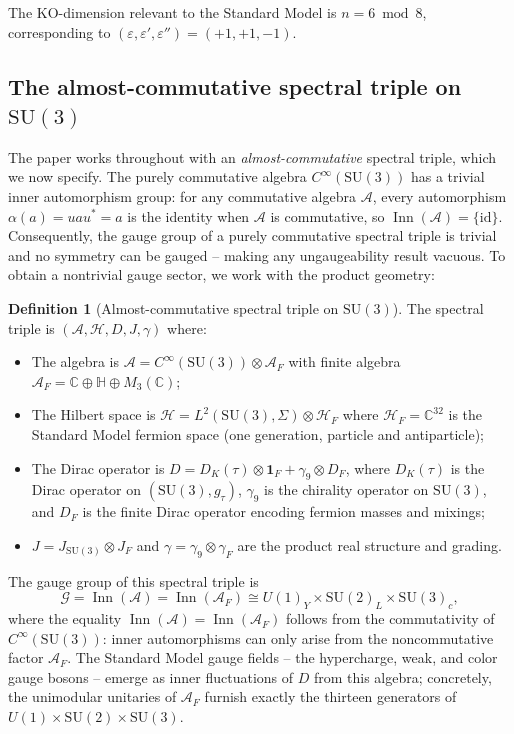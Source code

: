 \documentclass[12pt]{article}
\theoremstyle{definition}
\newtheorem{definition}[theorem]{Definition}
\theoremstyle{remark}
\newcommand{\Hil}{\mathcal{H}}
\newcommand{\Alg}{\mathcal{A}}
\newcommand{\Inn}{\operatorname{Inn}}
\begin{document}
The KO-dimension relevant to the Standard Model is $n = 6 \bmod 8$, corresponding to $(\varepsilon, \varepsilon', \varepsilon'') = (+1, +1, -1)$.

\subsection{The almost-commutative spectral triple on \texorpdfstring{$\mathrm{SU}(3)$}{SU(3)}}
\label{subsec:almostcommutative}

The paper works throughout with an \emph{almost-commutative} spectral triple, which we now specify.  The purely commutative algebra $C^\infty(\mathrm{SU}(3))$ has a trivial inner automorphism group: for any commutative algebra $\Alg$, every automorphism $\alpha(a) = u a u^* = a$ is the identity when $\Alg$ is commutative, so $\Inn(\Alg) = \{\mathrm{id}\}$.  Consequently, the gauge group of a purely commutative spectral triple is trivial and no symmetry can be gauged -- making any ungaugeability result vacuous.  To obtain a nontrivial gauge sector, we work with the product geometry:

\begin{definition}[Almost-commutative spectral triple on $\mathrm{SU}(3)$]\label{def:almostcomm}
\sloppy The spectral triple is $(\Alg, \Hil, D, J, \gamma)$ where:
\begin{itemize}
  \item The algebra is $\Alg = C^\infty(\mathrm{SU}(3)) \otimes \Alg_F$ with finite algebra $\Alg_F = \mathbb{C} \oplus \mathbb{H} \oplus M_3(\mathbb{C})$;
  \item The Hilbert space is $\Hil = L^2(\mathrm{SU}(3), \Sigma) \otimes \Hil_F$ where $\Hil_F = \mathbb{C}^{32}$ is the Standard Model fermion space (one generation, particle and antiparticle);
  \item The Dirac operator is $D = D_K(\tau) \otimes \mathbf{1}_F + \gamma_9 \otimes D_F$, where $D_K(\tau)$ is the Dirac operator on $(\mathrm{SU}(3), g_\tau)$, $\gamma_9$ is the chirality operator on $\mathrm{SU}(3)$, and $D_F$ is the finite Dirac operator encoding fermion masses and mixings;
  \item $J = J_{\mathrm{SU}(3)} \otimes J_F$ and $\gamma = \gamma_9 \otimes \gamma_F$ are the product real structure and grading.
\end{itemize}
\end{definition}

The gauge group of this spectral triple is
\begin{equation}\label{eq:gaugegroupSM}
  \mathcal{G} = \Inn(\Alg) = \Inn(\Alg_F) \cong U(1)_Y \times \mathrm{SU}(2)_L \times \mathrm{SU}(3)_c,
\end{equation}
where the equality $\Inn(\Alg) = \Inn(\Alg_F)$ follows from the commutativity of $C^\infty(\mathrm{SU}(3))$: inner automorphisms can only arise from the noncommutative factor $\Alg_F$.  The Standard Model gauge fields -- the hypercharge, weak, and color gauge bosons -- emerge as inner fluctuations of $D$ from this algebra; concretely, the unimodular unitaries of $\Alg_F$ furnish exactly the thirteen generators of $U(1) \times \mathrm{SU}(2) \times \mathrm{SU}(3)$.
\end{document}
